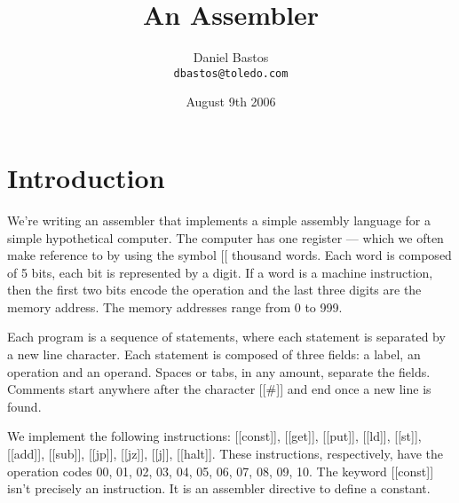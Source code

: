 \documentclass[a4paper,12pt]{article}
\begin{document}
\def\nwendcode{\endtrivlist \endgroup}
\let\nwdocspar=\par

\date{August 9th 2006}
\title{An Assembler}

\author{Daniel Bastos\\
        \tt{dbastos@toledo.com}}

\maketitle


\setlength{\parskip}{7pt}
\setlength{\parindent}{0pt}

\section{Introduction} We're writing an assembler that implements a
simple assembly language for a simple hypothetical computer. The
computer has one register --- which we often make reference to by using
the symbol [[%
thousand words. Each word is composed of 5 bits, each bit is represented
by a digit. If a word is a machine instruction, then the first two bits
encode the operation and the last three digits are the memory
address. The memory addresses range from 0 to 999.

Each program is a sequence of statements, where each statement is
separated by a new line character. Each statement is composed of three
fields: a label, an operation and an operand. Spaces or tabs, in any
amount, separate the fields. Comments start anywhere after the character
[[#]] and end once a new line is found.

We implement the following instructions: [[const]], [[get]], [[put]],
[[ld]], [[st]], [[add]], [[sub]], [[jp]], [[jz]], [[j]], [[halt]]. These
instructions, respectively, have the operation codes 00, 01, 02, 03, 04,
05, 06, 07, 08, 09, 10. The keyword [[const]] isn't precisely an
instruction. It is an assembler directive to define a constant.
%
\end{document}
